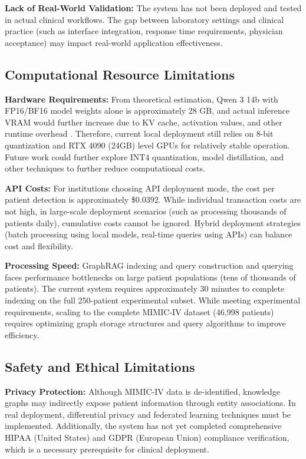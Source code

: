 \documentclass[11pt]{article}
\begin{document}
\textbf{Lack of Real-World Validation:} The system has not been deployed and tested in actual clinical workflows. The gap between laboratory settings and clinical practice (such as interface integration, response time requirements, physician acceptance) may impact real-world application effectiveness.

\subsection{Computational Resource Limitations}

\textbf{Hardware Requirements:} From theoretical estimation, Qwen 3 14b with FP16/BF16 model weights alone is approximately 28 GB, and actual inference VRAM would further increase due to KV cache, activation values, and other runtime overhead \citep{yang2025qwen3TechnicalReport,micikevicius2018mixedPrecision,fujii2024memoryConsumptionEstimator,kim2024llmem}. Therefore, current local deployment still relies on 8-bit quantization and RTX 4090 (24GB) level GPUs for relatively stable operation. Future work could further explore INT4 quantization, model distillation, and other techniques to further reduce computational costs.

\textbf{API Costs:} For institutions choosing API deployment mode, the cost per patient detection is approximately \$0.0392. While individual transaction costs are not high, in large-scale deployment scenarios (such as processing thousands of patients daily), cumulative costs cannot be ignored. Hybrid deployment strategies (batch processing using local models, real-time queries using APIs) can balance cost and flexibility.

\textbf{Processing Speed:} GraphRAG indexing and query construction and querying faces performance bottlenecks on large patient populations (tens of thousands of patients). The current system requires approximately 30 minutes to complete indexing on the full 250-patient experimental subset. While meeting experimental requirements, scaling to the complete MIMIC-IV dataset (46,998 patients) requires optimizing graph storage structures and query algorithms to improve efficiency.

\subsection{Safety and Ethical Limitations}

\textbf{Privacy Protection:} Although MIMIC-IV data is de-identified, knowledge graphs may indirectly expose patient information through entity associations. In real deployment, differential privacy and federated learning techniques must be implemented. Additionally, the system has not yet completed comprehensive HIPAA (United States) and GDPR (European Union) compliance verification, which is a necessary prerequisite for clinical deployment.
\end{document}
